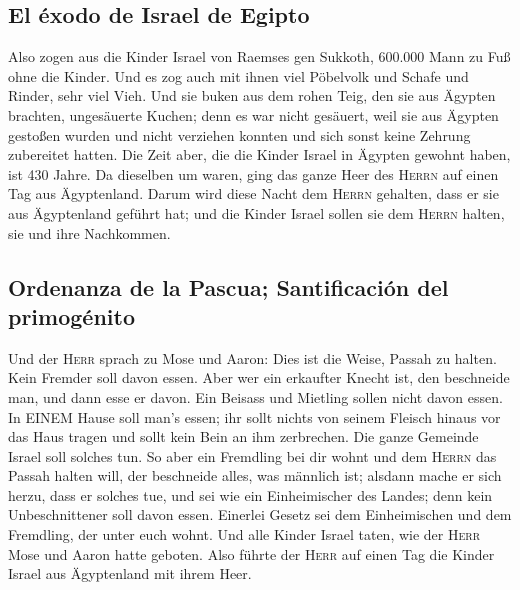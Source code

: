 \hypertarget{el-uxe9xodo-de-israel-de-egipto}{%
\subsection{El éxodo de Israel de
Egipto}\label{el-uxe9xodo-de-israel-de-egipto}}

 Also zogen aus die Kinder Israel von Raemses gen
Sukkoth, 600.000 Mann zu Fuß ohne die Kinder.  Und es zog
auch mit ihnen viel Pöbelvolk und Schafe und Rinder, sehr viel Vieh.
 Und sie buken aus dem rohen Teig, den sie aus Ägypten
brachten, ungesäuerte Kuchen; denn es war nicht gesäuert, weil sie aus
Ägypten gestoßen wurden und nicht verziehen konnten und sich sonst keine
Zehrung zubereitet hatten.  Die Zeit aber, die die Kinder
Israel in Ägypten gewohnt haben, ist 430 Jahre.  Da
dieselben um waren, ging das ganze Heer des \textsc{Herrn} auf einen Tag
aus Ägyptenland.  Darum wird diese Nacht dem
\textsc{Herrn} gehalten, dass er sie aus Ägyptenland geführt hat; und
die Kinder Israel sollen sie dem \textsc{Herrn} halten, sie und ihre
Nachkommen.

\hypertarget{ordenanza-de-la-pascua-santificaciuxf3n-del-primoguxe9nito}{%
\subsection{Ordenanza de la Pascua; Santificación del
primogénito}\label{ordenanza-de-la-pascua-santificaciuxf3n-del-primoguxe9nito}}

 Und der \textsc{Herr} sprach zu Mose und Aaron: Dies ist
die Weise, Passah zu halten. Kein Fremder soll davon essen.
 Aber wer ein erkaufter Knecht ist, den beschneide man,
und dann esse er davon.  Ein Beisass und Mietling sollen
nicht davon essen.  In EINEM Hause soll man's essen; ihr
sollt nichts von seinem Fleisch hinaus vor das Haus tragen und sollt
kein Bein an ihm zerbrechen.  Die ganze Gemeinde Israel
soll solches tun.  So aber ein Fremdling bei dir wohnt
und dem \textsc{Herrn} das Passah halten will, der beschneide alles, was
männlich ist; alsdann mache er sich herzu, dass er solches tue, und sei
wie ein Einheimischer des Landes; denn kein Unbeschnittener soll davon
essen.  Einerlei Gesetz sei dem Einheimischen und dem
Fremdling, der unter euch wohnt.  Und alle Kinder Israel
taten, wie der \textsc{Herr} Mose und Aaron hatte geboten.
 Also führte der \textsc{Herr} auf einen Tag die Kinder
Israel aus Ägyptenland mit ihrem Heer.

